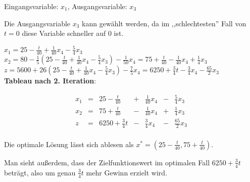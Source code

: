 \documentclass[a4paper,11pt]{article}
\newcommand{\bra}[1]{\left(#1\right)}
\begin{document}
\begin{enumerate}
\begin{enumerate}
        Eingangsvariable: $x_1$, Ausgangsvariable: $x_3$

        Die Ausgangsvariable $x_3$ kann gewählt werden, da im ,,schlechtesten'' Fall
        von $t=0$ diese Variable schneller auf 0 ist.

        \( x_1 = 25 - \frac{t}{40} + \frac{1}{40}x_4 - \frac{5}{4}x_3 \)\\
        \( x_2 = 80 - \frac{1}{5}\bra{25 - \frac{t}{40} + \frac{1}{40}x_4 - \frac{5}{4}x_3} - \frac{1}{50}x_4 = 75 + \frac{t}{40} - \frac{1}{40}x_4 + \frac{1}{4}x_3 \)\\
        \( z = 5600 + 26\bra{25 - \frac{t}{40} + \frac{1}{40}x_4 - \frac{5}{4}x_3} - \frac{7}{5}x_4 = 6250 + \frac{3}{4}t - \frac{3}{4}x_4 - \frac{65}{2}x_3 \)\\

        \textbf{Tableau nach 2. Iteration}:

        \[\begin{array}{rcrcrcr}
            x_1 & = &   25-\frac{t}{40} & + & \frac{1}{40}x_4 & - & \frac{5}{4}x_3 \\
            x_2 & = &   75+\frac{t}{40} & - & \frac{1}{40}x_4 & + & \frac{1}{4}x_3 \\ \hline
              z & = & 6250+\frac{3}{4}t & - &  \frac{3}{4}x_4 & - & \frac{65}{2}x_3\\
        \end{array}\]

        Die optimale Lösung lässt sich ablesen als $x^* = (25 - \frac{t}{40}, 75 + \frac{t}{40})$.

        Man sieht außerdem, dass der Zielfunktionswert im optimalen Fall $6250 + \frac{3}{4}t$
        beträgt, also um genau $\frac{3}{4}t$ mehr Gewinn erzielt wird.

    \end{enumerate}
\end{enumerate}
\end{document}
